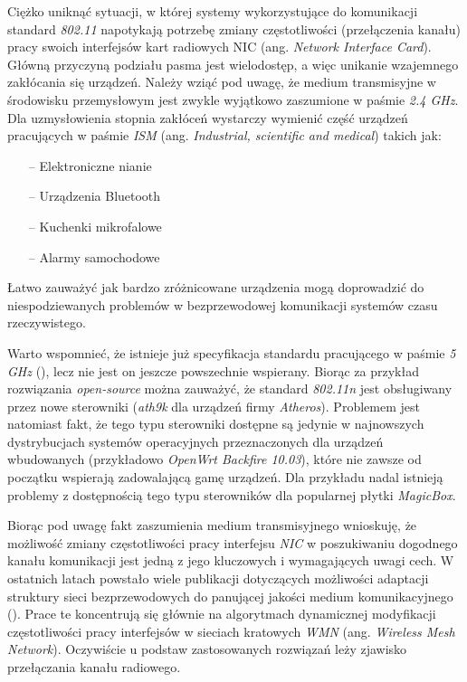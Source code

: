 %

Ciężko uniknąć sytuacji, w której systemy wykorzystujące do komunikacji standard \emph{802.11} napotykają potrzebę zmiany częstotliwości (przełączenia kanału) pracy swoich interfejsów kart radiowych NIC (ang. \emph{Network Interface Card}). Główną przyczyną podziału pasma jest wielodostęp, a więc unikanie wzajemnego zakłócania się urządzeń. Należy wziąć pod uwagę, że medium transmisyjne w środowisku przemysłowym jest zwykle wyjątkowo zaszumione w paśmie \emph{2.4 GHz}. Dla uzmysłowienia stopnia zakłóceń wystarczy wymienić część urządzeń pracujących w paśmie \emph{ISM} (ang. \emph{Industrial, scientific and medical}) takich jak:
\begin{itemize}
\item[--] Elektroniczne nianie
\item[--] Urządzenia Bluetooth
\item[--] Kuchenki mikrofalowe
\item[--] Alarmy samochodowe
\end{itemize}
Łatwo zauważyć jak bardzo zróżnicowane urządzenia mogą doprowadzić do niespodziewanych problemów w bezprzewodowej komunikacji systemów czasu rzeczywistego.

Warto wspomnieć, że istnieje już specyfikacja standardu pracującego w paśmie \emph{5 GHz} (\cite{std:IEEE80211n}), lecz nie jest on jeszcze powszechnie wspierany. Biorąc za przykład rozwiązania \emph{open-source} można zauważyć, że standard \emph{802.11n} jest obsługiwany przez nowe sterowniki (\emph{ath9k} dla urządzeń firmy \emph{Atheros}). Problemem jest natomiast fakt, że tego typu sterowniki dostępne są jedynie w najnowszych dystrybucjach systemów operacyjnych przeznaczonych dla urządzeń wbudowanych (przykładowo \emph{OpenWrt Backfire 10.03}), które nie zawsze od początku wspierają zadowalającą gamę urządzeń. Dla przykładu nadal istnieją problemy z dostępnością tego typu sterowników dla popularnej płytki \emph{MagicBox}.

Biorąc pod uwagę fakt zaszumienia medium transmisyjnego wnioskuję, że możliwość zmiany częstotliwości pracy interfejsu \emph{NIC} w poszukiwaniu dogodnego kanału komunikacji jest jedną z jego kluczowych i wymagających uwagi cech. W ostatnich latach powstało wiele publikacji dotyczących możliwości adaptacji struktury sieci bezprzewodowych do panującej jakości medium komunikacyjnego (\cite{pub:DCS}). Prace te koncentrują się głównie na algorytmach dynamicznej modyfikacji częstotliwości pracy interfejsów w sieciach kratowych \emph{WMN} (ang. \emph{Wireless Mesh Network}). Oczywiście u podstaw zastosowanych rozwiązań leży zjawisko przełączania kanału radiowego.

